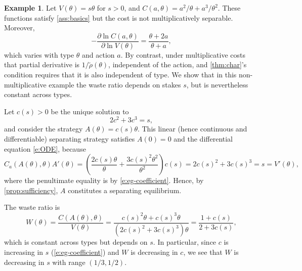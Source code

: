 \documentclass[12 pt]{article}
\theoremstyle{remark}
\theoremstyle{definition}
\newtheorem{example}{Example}
\begin{document}
\begin{example}
\label{eg:countereg}
Let $V(\theta) = s \theta$ for $s>0$, and $C(a,\theta) = a^2/\theta + a^3/\theta^2$. These functions satisfy \autoref{ass:basics} but the cost  is not multiplicatively separable. Moreover, %
$$-\frac{\partial \ln C(a,\theta)}{\partial \ln V(\theta)}=\frac{\theta+2a}{\theta+a},$$ which varies with type $\theta$ and action $a$. By contrast, under multiplicative costs that partial derivative is $1 / \tilde{\rho}(\theta)$, independent of the action, and \autoref{thm:char}'s condition requires that it is also independent of type. We show that in this non-multiplicative example the waste ratio depends on stakes $s$, but is nevertheless constant across types.

Let $c(s) > 0$ be the unique solution to 
\begin{equation}
\label{e:eg-coefficient}
2c^2 + 3c^3 = s,
\end{equation} and consider the strategy $A(\theta) = c(s) \theta$. This linear (hence continuous and differentiable) separating strategy satisfies $A(0) = 0$ and the differential equation \eqref{e:ODE}, because
\[
C_a(A(\theta),\theta) A'(\theta) = \left(\frac{2c(s)\theta}{\theta} + \frac{3c(s)^2\theta^2}{\theta^2}\right)c(s) = 2c(s)^2 + 3c(s)^3 = s = V'(\theta),
\]
where the penultimate equality is by \eqref{e:eg-coefficient}.
Hence, by \autoref{prop:sufficiency}, $A$ constitutes a separating equilibrium.

The waste ratio is
\[
W(\theta) = \frac{C(A(\theta),\theta)}{V(\theta)} = \frac{c(s)^2 \theta + c(s)^3 \theta}{(2c(s)^2 + 3c(s)^3)\theta} = \frac{1 + c(s)}{2 + 3c(s)},
\]
which is constant across types but depends on $s$. In particular, since $c$ is increasing in $s$ (\autoref{e:eg-coefficient}) and $W$ is decreasing in $c$, we see that $W$ is decreasing in $s$ with range %
$(1/3,1/2)$.
\end{example}
\end{document}
